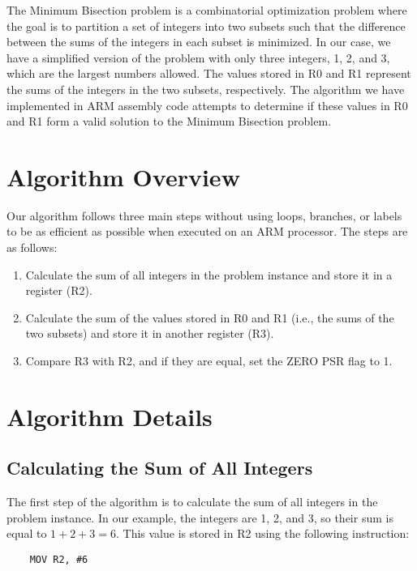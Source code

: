 The Minimum Bisection problem is a combinatorial optimization problem where the goal is to partition a set of integers into two subsets such that the difference between the sums of the integers in each subset is minimized. In our case, we have a simplified version of the problem with only three integers, 1, 2, and 3, which are the largest numbers allowed. The values stored in R0 and R1 represent the sums of the integers in the two subsets, respectively. The algorithm we have implemented in ARM assembly code attempts to determine if these values in R0 and R1 form a valid solution to the Minimum Bisection problem.

\section{Algorithm Overview}

Our algorithm follows three main steps without using loops, branches, or labels to be as efficient as possible when executed on an ARM processor. The steps are as follows:

\begin{enumerate}
    \item Calculate the sum of all integers in the problem instance and store it in a register (R2).
    \item Calculate the sum of the values stored in R0 and R1 (i.e., the sums of the two subsets) and store it in another register (R3).
    \item Compare R3 with R2, and if they are equal, set the ZERO PSR flag to 1.
\end{enumerate}

\section{Algorithm Details}

\subsection{Calculating the Sum of All Integers}

The first step of the algorithm is to calculate the sum of all integers in the problem instance. In our example, the integers are 1, 2, and 3, so their sum is equal to $1 + 2 + 3 = 6$. This value is stored in R2 using the following instruction:

\begin{verbatim}
    MOV R2, #6
\end{verbatim}

